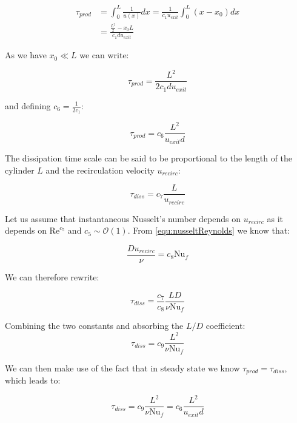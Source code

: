 \begin{equation}
\begin{aligned}
\tau_{prod} &= \int_{0}^{L} \frac{1}{u(x)} dx = \frac{1}{c_1 u_{exit}} \int_0^L \left( x - x_0 \right) dx \\[2ex]
 &= \frac{\frac{L^2}{2} - x_0L}{c_1du_{exit}}
\end{aligned}
\end{equation}

\noindent As we have $x_0\ll L$ we can write:

\begin{equation}
\tau_{prod} = \frac{L^2}{2c_1du_{exit}}
\end{equation}

\noindent and defining $c_6 = \frac{1}{2c_1}$:

\begin{equation}
\tau_{prod} = c_6 \frac{L^2}{u_{exit} d}
\end{equation}

\noindent The dissipation time scale can be said to be proportional to the length of the cylinder $L$ and the recirculation velocity $u_{recirc}$: 

\begin{equation}
\tau_{diss} = c_7 \frac{L}{u_{recirc}}
\end{equation}

\noindent Let us assume that instantaneous Nusselt's number depends on $u_{recirc}$ as it depends on $\text{Re}^{c_5}$ and $c_5\sim\mathcal{O}(1)$. From \cref{equ:nusseltReynolds} we know that: 

\begin{equation}
\frac{D u_{recirc}}{\nu} = c_8 \text{Nu}_f
\end{equation}

\noindent We can therefore rewrite:

\begin{equation}
\tau_{diss} = \frac{c_7}{c_8} \frac{LD}{\nu \text{Nu}_f}
\end{equation}

\noindent Combining the two constants and absorbing the $L/D$ coefficient:
\begin{equation}
\tau_{diss} = c_9 \frac{L^2}{\nu \text{Nu}_f}
\end{equation}

\noindent We can then make use of the fact that in steady state we know $\tau_{prod} = \tau_{diss}$, which leads to:

\begin{equation}
\tau_{diss} = c_9 \frac{L^2}{\nu \text{Nu}_f} = c_6 \frac{L^2}{u_{exit} d}
\end{equation}

